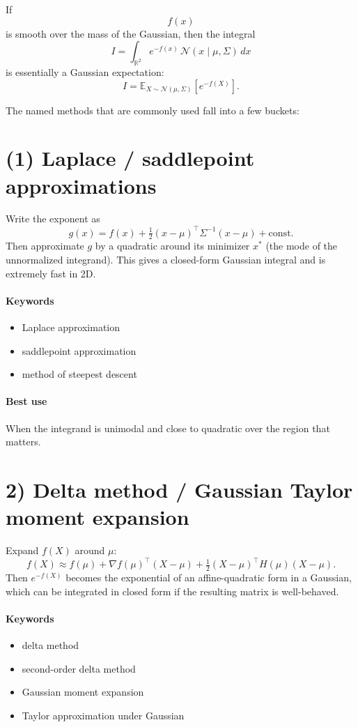\documentclass{article}
\begin{document}
If
\[
f(x)
\]
is smooth over the mass of the Gaussian, then the integral
\[
I = \int_{\mathbb R^2} e^{-f(x)} \, \mathcal N(x \mid \mu, \Sigma)\, dx
\]
is essentially a Gaussian expectation:
\[
I = \mathbb E_{X \sim \mathcal N(\mu,\Sigma)}\!\left[e^{-f(X)}\right].
\]

The named methods that are commonly used fall into a few buckets:

\section*{(1) Laplace / saddlepoint approximations}
Write the exponent as
\[
g(x) = f(x) + \tfrac12 (x-\mu)^\top \Sigma^{-1}(x-\mu) + \text{const}.
\]
Then approximate $g$ by a quadratic around its minimizer $x^*$ (the mode of the unnormalized integrand). This gives a closed-form Gaussian integral and is extremely fast in 2D.

\paragraph{Keywords}
\begin{itemize}
  \item Laplace approximation
  \item saddlepoint approximation
  \item method of steepest descent
\end{itemize}

\paragraph{Best use}
When the integrand is unimodal and close to quadratic over the region that matters.

\section*{2) Delta method / Gaussian Taylor moment expansion}
Expand \(f(X)\) around \(\mu\):
\[
f(X) \approx f(\mu) + \nabla f(\mu)^\top (X-\mu) + \tfrac12 (X-\mu)^\top H(\mu)(X-\mu).
\]
Then \(e^{-f(X)}\) becomes the exponential of an affine-quadratic form in a Gaussian, which can be integrated in closed form if the resulting matrix is well-behaved.

\paragraph{Keywords}
\begin{itemize}
  \item delta method
  \item second-order delta method
  \item Gaussian moment expansion
  \item Taylor approximation under Gaussian
\end{itemize}
\end{document}
